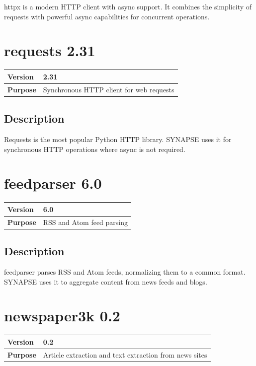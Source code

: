 \documentclass[12pt,a4paper]{report}
\begin{document}
httpx is a modern HTTP client with async support. It combines the simplicity of requests with powerful async capabilities for concurrent operations.

\section{requests 2.31}

\begin{tabular}{|p{4cm}|p{10cm}|}
\hline
\textbf{Version} & 2.31 \\
\hline
\textbf{Purpose} & Synchronous HTTP client for web requests \\
\hline
\end{tabular}

\subsection{Description}

Requests is the most popular Python HTTP library. SYNAPSE uses it for synchronous HTTP operations where async is not required.

\section{feedparser 6.0}

\begin{tabular}{|p{4cm}|p{10cm}|}
\hline
\textbf{Version} & 6.0 \\
\hline
\textbf{Purpose} & RSS and Atom feed parsing \\
\hline
\end{tabular}

\subsection{Description}

feedparser parses RSS and Atom feeds, normalizing them to a common format. SYNAPSE uses it to aggregate content from news feeds and blogs.

\section{newspaper3k 0.2}

\begin{tabular}{|p{4cm}|p{10cm}|}
\hline
\textbf{Version} & 0.2 \\
\hline
\textbf{Purpose} & Article extraction and text extraction from news sites \\
\hline
\end{tabular}
\end{document}
